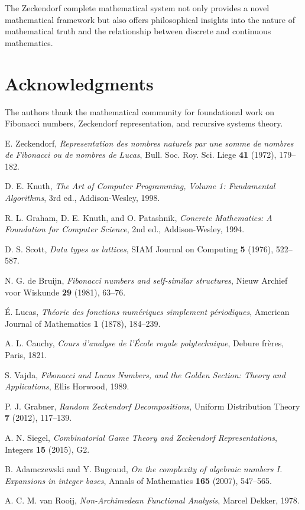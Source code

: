 \documentclass[12pt]{article}
\theoremstyle{plain}
\theoremstyle{definition}
\begin{document}
The Zeckendorf complete mathematical system not only provides a novel mathematical framework but also offers philosophical insights into the nature of mathematical truth and the relationship between discrete and continuous mathematics.

\section*{Acknowledgments}

The authors thank the mathematical community for foundational work on Fibonacci numbers, Zeckendorf representation, and recursive systems theory.

\begin{thebibliography}{99}
E. Zeckendorf, \textit{Representation des nombres naturels par une somme de nombres de Fibonacci ou de nombres de Lucas}, Bull. Soc. Roy. Sci. Liege \textbf{41} (1972), 179--182.

D. E. Knuth, \textit{The Art of Computer Programming, Volume 1: Fundamental Algorithms}, 3rd ed., Addison-Wesley, 1998.

R. L. Graham, D. E. Knuth, and O. Patashnik, \textit{Concrete Mathematics: A Foundation for Computer Science}, 2nd ed., Addison-Wesley, 1994.

D. S. Scott, \textit{Data types as lattices}, SIAM Journal on Computing \textbf{5} (1976), 522--587.

N. G. de Bruijn, \textit{Fibonacci numbers and self-similar structures}, Nieuw Archief voor Wiskunde \textbf{29} (1981), 63--76.

É. Lucas, \textit{Théorie des fonctions numériques simplement périodiques}, American Journal of Mathematics \textbf{1} (1878), 184--239.

A. L. Cauchy, \textit{Cours d'analyse de l'École royale polytechnique}, Debure frères, Paris, 1821.

S. Vajda, \textit{Fibonacci and Lucas Numbers, and the Golden Section: Theory and Applications}, Ellis Horwood, 1989.

P. J. Grabner, \textit{Random Zeckendorf Decompositions}, Uniform Distribution Theory \textbf{7} (2012), 117--139.

A. N. Siegel, \textit{Combinatorial Game Theory and Zeckendorf Representations}, Integers \textbf{15} (2015), G2.

B. Adamczewski and Y. Bugeaud, \textit{On the complexity of algebraic numbers I. Expansions in integer bases}, Annals of Mathematics \textbf{165} (2007), 547--565.

A. C. M. van Rooij, \textit{Non-Archimedean Functional Analysis}, Marcel Dekker, 1978.

\end{thebibliography}
\end{document}
